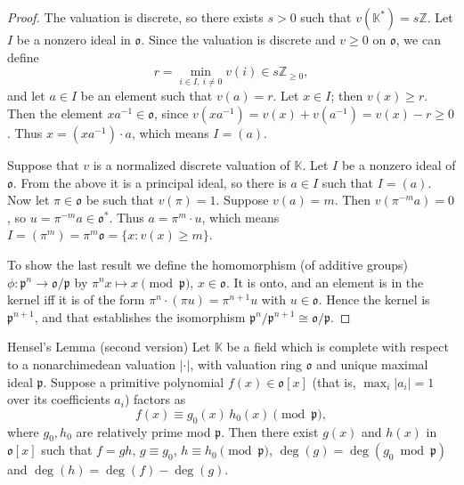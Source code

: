 \documentclass[11pt]{article}
\begin{document}
\begin{proof}
The valuation is discrete, so there exists $s > 0$ such that $v(\mathbb{K}^*) = s\mathbb{Z}$. Let $I$ be a nonzero ideal in $\mathfrak{o}$. Since the valuation is discrete and $v \geq 0$ on $\mathfrak{o}$, we can define
\[
r = \min_{i \in I,\ i \neq 0} v(i) \in s\mathbb{Z}_{\geq 0},
\]
and let $a \in I$ be an element such that $v(a) = r$. Let $x \in I$; then $v(x) \geq r$. Then the element $xa^{-1} \in \mathfrak{o}$, since $v(xa^{-1}) = v(x) + v(a^{-1}) = v(x) - r \geq 0$. Thus $x = (xa^{-1})\cdot a$, which means $I = (a)$.

Suppose that $v$ is a normalized discrete valuation of $\mathbb{K}$. Let $I$ be a nonzero ideal of $\mathfrak{o}$. From the above it is a principal ideal, so there is $a \in I$ such that $I = (a)$. Now let $\pi \in \mathfrak{o}$ be such that $v(\pi) = 1$. Suppose $v(a) = m$. Then $v(\pi^{-m}a) = 0$, so $u = \pi^{-m}a \in \mathfrak{o}^*$. Thus $a = \pi^m \cdot u$, which means $I = (\pi^m) = \pi^m \mathfrak{o} = \{x : v(x) \geq m\}$.

To show the last result we define the homomorphism (of additive groups) $\phi : \mathfrak{p}^n \rightarrow \mathfrak{o}/\mathfrak{p}$ by $\pi^n x \mapsto x \pmod{\mathfrak{p}}$, $x \in \mathfrak{o}$. It is onto, and an element is in the kernel iff it is of the form $\pi^n \cdot (\pi u) = \pi^{n+1}u$ with $u \in \mathfrak{o}$. Hence the kernel is $\mathfrak{p}^{n+1}$, and that establishes the isomorphism $\mathfrak{p}^n / \mathfrak{p}^{n+1} \cong \mathfrak{o}/\mathfrak{p}$.
\end{proof}

\begin{thmbox}{Hensel's Lemma (second version)}
Let $\mathbb{K}$ be a field which is complete with respect to a nonarchimedean valuation $|\cdot|$, with valuation ring $\mathfrak{o}$ and unique maximal ideal $\mathfrak{p}$. Suppose a primitive polynomial $f(x) \in \mathfrak{o}[x]$ (that is, $\max_i |a_i| = 1$ over its coefficients $a_i$) factors as
\[
f(x) \equiv g_0(x)\, h_0(x) \pmod{\mathfrak{p}},
\]
where $g_0, h_0$ are relatively prime mod $\mathfrak{p}$. Then there exist $g(x)$ and $h(x)$ in $\mathfrak{o}[x]$ such that $f = gh$, $g \equiv g_0$, $h \equiv h_0 \pmod{\mathfrak{p}}$, $\deg(g) = \deg(g_0 \bmod \mathfrak{p})$ and $\deg(h) = \deg(f) - \deg(g)$.
\end{thmbox}
\end{document}
